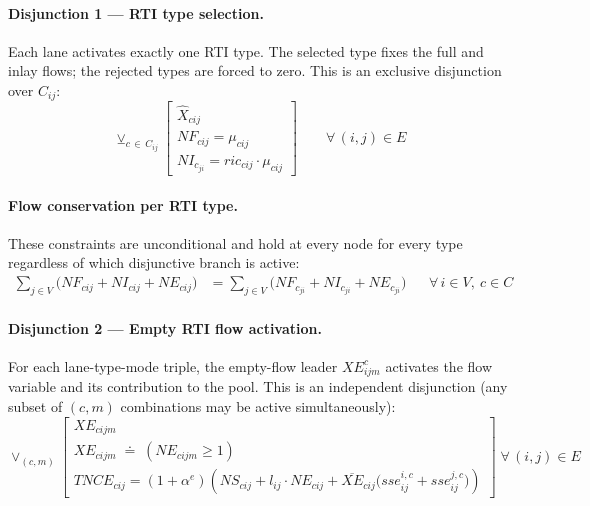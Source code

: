 
\paragraph{Disjunction 1 — RTI type selection.}
Each lane activates exactly one RTI type. The selected type fixes
the full and inlay flows; the rejected types are forced to zero.
This is an exclusive disjunction over $C_{ij}$:
%
\begin{equation}
  \veebar_{c\,\in\,C_{ij}}
  \begin{bmatrix}
    \hat{X}_{cij} \\[4pt]
    NF_{cij} = \mu_{cij} \\[2pt]
    NI_{c}_{ji} = ric_{cij}\cdot\mu_{cij}
  \end{bmatrix}
  \qquad \forall\,(i,j)\in E
  \label{eq:disj-type}
\end{equation}


\paragraph{Flow conservation per RTI type.}
These constraints are unconditional and hold at every node for
every type regardless of which disjunctive branch is active:
%
\begin{align}
  \sum_{j\in V}\!\bigl(NF_{cij}+NI_{cij}+NE_{cij}\bigr)
  &=
  \sum_{j\in V}\!\bigl(NF_{c}_{ji}+NI_{c}_{ji}+NE_{c}_{ji}\bigr)
  && \forall\, i\in V,\ c\in C
  \label{eq:conservation}
\end{align}


\paragraph{Disjunction 2 — Empty RTI flow activation.}
For each lane-type-mode triple, the empty-flow leader $XE^c_{ijm}$
activates the flow variable and its contribution to the pool.
This is an independent disjunction (any subset of
$(c,m)$ combinations may be active simultaneously):
%
\begin{equation}
  \vee_{(c,m)}
  \begin{bmatrix}
    XE_{cijm} \\[4pt]
    XE_{cijm} \;\doteq\; (NE_{cijm} \geq 1) \\[2pt]
    TNCE_{cij} = (1+\alpha^{e})\!\left(
      NS_{cij}
      + l_{ij}\cdot NE_{cij}
      + \overline{XE}_{cij}
        \bigl(sse^{i,c}_{ij}+sse^{j,c}_{ij}\bigr)
    \right)
  \end{bmatrix}
  \;\forall\,(i,j)\in E
  \label{eq:disj-empty}
\end{equation}


